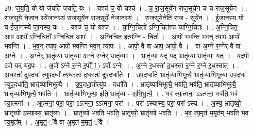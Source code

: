 \documentclass[17pt]{extarticle}
\begin{document}
29. ज॒य॒ति॒ यो यो ज॑यति जयति॒ यः । . यश्च॑ च॒ यो यश्च॑ । . च॒ रा॒ज॒सूये॑न राज॒सूये॑न च च राज॒सूये॑न । . रा॒ज॒सूये॑ नेजा॒न स्ये॑जा॒नस्य॑ राज॒सूये॑न राज॒सूये॑ नेजा॒नस्य॑ । . रा॒ज॒सूये॒नेति॑ राज - सूये॑न । . ई॒जा॒नस्य॒ यो य ई॑जा॒नस्ये॑ जा॒नस्य॒ यः । . यश्च॑ च॒ यो यश्च॑ । . चा॒ग्नि॒चितो᳚ ऽग्नि॒चित॑श्च चाग्नि॒चितः॑ । . अ॒ग्नि॒चित॒ आप॒ आपो᳚ ऽग्नि॒चितो᳚ ऽग्नि॒चित॒ आपः॑ । . अ॒ग्नि॒चित॒ इत्य॑ग्नि - चितः॑ । . आपो॑ भवन्ति भव॒न् त्याप॒ आपो॑ भवन्ति । . भ॒व॒न् त्याप॒ आपो॑ भवन्ति भव॒न् त्यापः॑ । . आपो॒ वै वा आप॒ आपो॒ वै । . वा अ॒ग्ने र॒ग्नेर् वै वा अ॒ग्नेः । . अ॒ग्नेर् भ्रातृ॑व्या॒ भ्रातृ॑व्या अ॒ग्ने र॒ग्नेर् भ्रातृ॑व्याः । . भ्रातृ॑व्या॒ यद् यद् भ्रातृ॑व्या॒ भ्रातृ॑व्या॒ यत् । . यद॒पो॑ ऽपो यद् यद॒पः । . अ॒पो᳚ ऽग्ने र॒ग्ने र॒पो᳚(1॒) ऽपो᳚ ऽग्नेः । . अ॒ग्ने र॒धस्ता॑ द॒धस्ता॑ द॒ग्ने र॒ग्ने र॒धस्ता᳚त् । . अ॒धस्ता॑ दुप॒दधा᳚ त्युप॒दधा᳚ त्य॒धस्ता॑ द॒धस्ता॑ दुप॒दधा॑ति । . उ॒प॒दधा॑ति॒ भ्रातृ॑व्याभिभूत्यै॒ भ्रातृ॑व्याभिभूत्या उप॒दधा᳚ त्युप॒दधा॑ति॒ भ्रातृ॑व्याभिभूत्यै । . उ॒प॒दधा॒तीत्यु॑प - दधा॑ति । . भ्रातृ॑व्याभिभूत्यै॒ भव॑ति॒ भव॑ति॒ भ्रातृ॑व्याभिभूत्यै॒ भ्रातृ॑व्याभिभूत्यै॒ भव॑ति । . भ्रातृ॑व्याभिभूत्या॒ इति॒ भ्रातृ॑व्य - अ॒भि॒भू॒त्यै॒ । . भव॑ त्या॒त्मना॒ ऽऽत्मना॒ भव॑ति॒ भव॑ त्या॒त्मना᳚ । . आ॒त्मना॒ परा॒ परा॒ ऽऽत्मना॒ ऽऽत्मना॒ परा᳚ । . परा᳚ ऽस्यास्य॒ परा॒ परा᳚ ऽस्य । . अ॒स्य॒ भ्रातृ॑व्यो॒ भ्रातृ॑व्यो ऽस्यास्य॒ भ्रातृ॑व्यः । . भ्रातृ॑व्यो भवति भवति॒ भ्रातृ॑व्यो॒ भ्रातृ॑व्यो भवति । . भ॒व॒ त्य॒मृत॑ म॒मृत॑म् भवति भव त्य॒मृत᳚म् । . अ॒मृतं॒ ॅवै वा अ॒मृत॑ म॒मृतं॒ ॅवै । \newline
\end{document}
